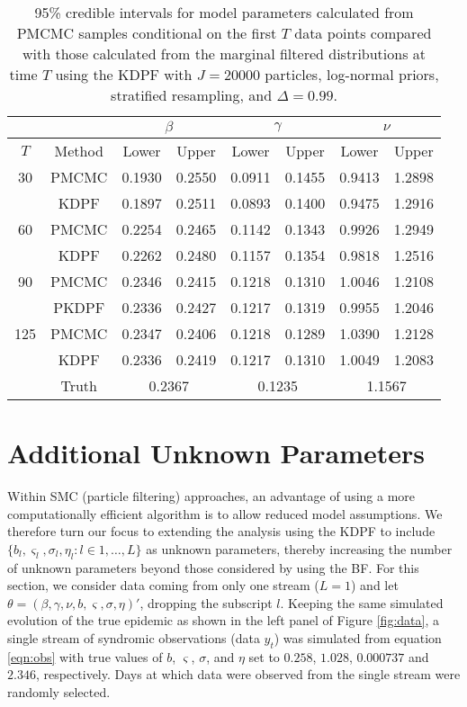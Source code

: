 \documentclass{elsarticle}
\begin{document}
\begin{table}
\begin{center}
\begin{tabular}{|c|c|cc|cc|cc|}
\hline
 & & \multicolumn{2}{|c|}{$\beta$} & \multicolumn{2}{|c|}{$\gamma$} & \multicolumn{2}{|c|}{$\nu$} \\
\hline
$T$ & Method & Lower & Upper & Lower & Upper & Lower & Upper \\
\hline
30 & PMCMC & 0.1930 & 0.2550 & 0.0911 & 0.1455 & 0.9413 & 1.2898 \\
   & KDPF & 0.1897 & 0.2511 & 0.0893 & 0.1400 & 0.9475 & 1.2916 \\
\hline
60 & PMCMC & 0.2254 & 0.2465 & 0.1142 & 0.1343 & 0.9926 & 1.2949 \\
   & KDPF & 0.2262 & 0.2480 & 0.1157 & 0.1354 & 0.9818 & 1.2516 \\
\hline
90 & PMCMC & 0.2346 & 0.2415 & 0.1218 & 0.1310 & 1.0046 & 1.2108 \\
   & PKDPF & 0.2336 & 0.2427 & 0.1217 & 0.1319 & 0.9955 & 1.2046 \\
\hline
125 & PMCMC & 0.2347 & 0.2406 & 0.1218 & 0.1289 & 1.0390 & 1.2128 \\
   & KDPF & 0.2336 & 0.2419 & 0.1217 & 0.1310 & 1.0049 & 1.2083 \\
\hline
 & Truth & \multicolumn{2}{|c|}{0.2367} & \multicolumn{2}{|c|}{0.1235} & \multicolumn{2}{|c|}{1.1567} \\
\hline
\end{tabular}
\caption{95\% credible intervals for model parameters calculated from PMCMC samples conditional on the first $T$ data points compared with those calculated from the marginal filtered distributions at time $T$ using the KDPF with $J = 20000$ particles, log-normal priors, stratified resampling, and $\Delta = 0.99$.}
\label{tab:mcmc}
\end{center}
\end{table}

\section{Additional Unknown Parameters \label{sec:extend}}

Within SMC (particle filtering) approaches, an advantage of using a more computationally efficient algorithm is to allow reduced model assumptions. We therefore turn our focus to extending the analysis using the KDPF to include $\{b_l,\varsigma_l,\sigma_l,\eta_l:l\in1,\ldots,L\}$ as unknown parameters, thereby increasing the number of unknown parameters beyond those considered by \citet{skvortsov2012monitoring} using the BF. For this section, we consider data coming from only one stream ($L = 1$) and let $\theta = (\beta, \gamma, \nu, b, \varsigma, \sigma, \eta)'$, dropping the subscript $l$. Keeping the same simulated evolution of the true epidemic as shown in the left panel of Figure \ref{fig:data}, a single stream of syndromic observations (data $y_t$) was simulated from equation \eqref{eqn:obs} with true values of $b$, $\varsigma$, $\sigma$, and $\eta$ set to $0.258$, $1.028$, $0.000737$ and $2.346$, respectively. Days at which data were observed from the single stream were randomly selected.
\end{document}
